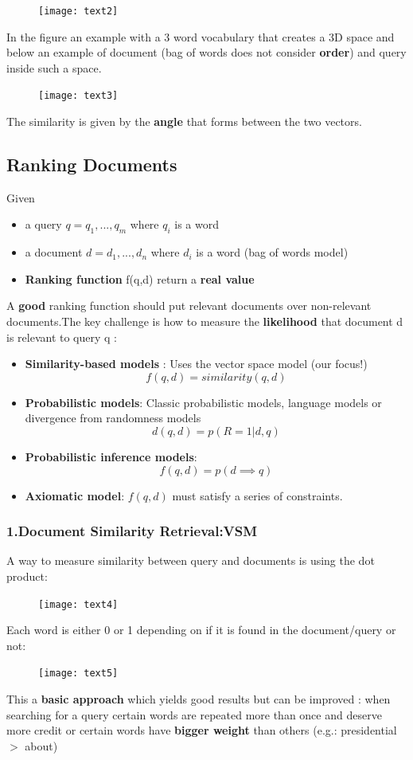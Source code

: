 \begin{figure}[H]
  \centering
  \texttt{[image: text2]}
\end{figure}
In the figure an example with a 3 word vocabulary that creates a 3D space and below an example of document (bag of words does not consider \textbf{order}) and query inside such a space.
\begin{figure}[H]
  \centering
  \texttt{[image: text3]}
\end{figure}
The similarity is given by the \textbf{angle} that forms between the two vectors.\\

\subsection{Ranking Documents}
Given\begin{itemize}
\item a query $q=q_1,...,q_m$ where $q_i$ is a word 
\item a document $d=d_1,...,d_n$ where $d_i$ is a word (bag of words model)
\item \textbf{Ranking function} f(q,d) return a \textbf{real value}
\end{itemize} 
A \textbf{good} ranking function should put relevant documents over non-relevant documents.The key challenge is how to measure the \textbf{likelihood} that document d is relevant to query q :
\begin{itemize}
\item \textbf{Similarity-based models} : 
Uses the vector space model (our focus!)
$$ f(q,d) = similarity(q,d)$$ 

\item \textbf{Probabilistic models}:
Classic probabilistic models, language models or divergence from randomness models
$$ d(q,d) = p(R=1 |d,q)$$

\item \textbf{Probabilistic inference models}:
$$ f(q,d) = p(d \implies q)$$

\item \textbf{Axiomatic model}:
$f(q,d)$ must satisfy a series of constraints.
\end{itemize}

\subsubsection{1.Document Similarity Retrieval:VSM} 
A way to measure similarity between query and documents is using the dot product:
\begin{figure}[H]
  \centering
  \texttt{[image: text4]}
\end{figure}
Each word is either 0 or 1 depending on if it is found in the document/query or not:
\begin{figure}[H]
  \centering
  \texttt{[image: text5]}
\end{figure}
This a \textbf{basic approach} which yields good results but can be improved : when searching for a query certain words are repeated more than once and deserve more credit or certain words have \textbf{bigger weight} than others (e.g.: presidential $>$ about)

